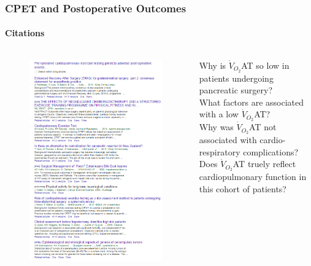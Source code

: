 \documentclass{beamer}
\begin{document}
\begin{frame}
	\frametitle{CPET and Postoperative Outcomes}
	\framesubtitle{Citations}
	\begin{columns}[c]
		\begin{figure}
			\centering
			\includegraphics[width=\textwidth]{cpet_citations}
		\end{figure}
	
	Why is $\dot{V}_{O_2}$AT so low in patients undergoing pancreatic surgery?\\
	\medskip
	What factors are associated with a low $\dot{V}_{O_2}$AT?\\
	\medskip
	Why was $\dot{V}_{O_2}$AT not associated with cardio-respiratory complications?\\
	\medskip
	Does $\dot{V}_{O_2}$AT truely reflect cardiopulmonary function in this cohort of patients?\\	
	\end{columns}
\end{frame}
\end{document}
